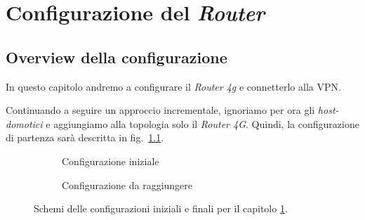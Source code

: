 
\chapter{Configurazione del \textit{Router}}
\label{ch:configurazione-router}

\section{Overview della configurazione \ok}

In questo capitolo andremo a configurare il \textit{Router 4g} e connetterlo alla VPN.

Continuando a seguire un approccio incrementale, ignoriamo per ora gli \textit{host-domotici} e aggiungiamo alla topologia solo il \textit{Router 4G}. Quindi, la configurazione di partenza sarà descritta in fig.~\ref{fig:conf-init-router}.

\newsavebox{\myimagea}
\begin{figure}[H]
    \centering%
    \begin{subfigure}{0.4\textwidth}
        \centering
        \usebox{\myimagea}
        \caption{Configurazione iniziale}
        \label{fig:conf-init-router}
    \end{subfigure}
    \hfill%
    \begin{subfigure}{0.5\textwidth}
        \centering
        \caption{Configurazione da raggiungere}
        \label{fig:conf-final-router}
    \end{subfigure}
    \caption{Schemi delle configurazioni iniziali e finali per il capitolo \ref{ch:configurazione-router}.}
\end{figure}

